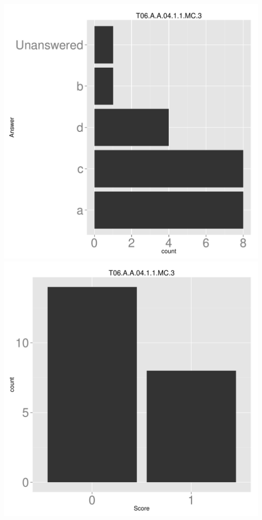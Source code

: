 \documentclass[12pt,nohyper]{tufte-handout}\usepackage[]{graphicx}\usepackage[]{color}
\begin{document}
\begin{center} \includegraphics[width=.45\linewidth]{Topic06_3_answer} \includegraphics[width=.45\linewidth]{Topic06_3_score} \end{center} 
\end{document}
